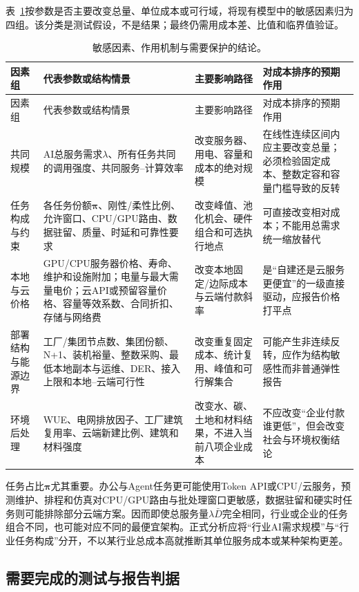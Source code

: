 \documentclass[preprint]{elsarticle}
\begin{document}
表~\ref{tab:sensitivity-driver-map}按参数是否主要改变总量、单位成本或可行域，将现有模型中的敏感因素归为四组。该分类是测试假设，不是结果；最终仍需用成本差、比值和临界值验证。

\begin{longtable}{p{2.6cm}p{4.7cm}p{3.6cm}p{3.0cm}}
 \caption{敏感因素、作用机制与需要保护的结论。}\label{tab:sensitivity-driver-map}\\
 \toprule
 因素组 & 代表参数或结构情景 & 主要影响路径 & 对成本排序的预期作用 \\
 \midrule
 \endfirsthead
 \toprule
 因素组 & 代表参数或结构情景 & 主要影响路径 & 对成本排序的预期作用 \\
 \midrule
 \endhead
 共同规模 & AI总服务需求$\lambda$、所有任务共同的调用强度、共同服务--计算效率 & 改变服务器、用电、容量和成本的绝对规模 & 在线性连续区间内应主要改变总量；必须检验固定成本、整数定容和容量门槛导致的反转 \\
 任务构成与约束 & 各任务份额$\bm\pi$、刚性/柔性比例、允许窗口、CPU/GPU路由、数据驻留、质量、时延和可靠性要求 & 改变峰值、池化机会、硬件组合和可选执行地点 & 可直接改变相对成本；不能用总需求统一缩放替代 \\
 本地与云价格 & GPU/CPU服务器价格、寿命、维护和设施附加；电量与最大需量电价；云API或预留容量价格、容量等效系数、合同折扣、存储与网络费 & 改变本地固定/边际成本与云端付款斜率 & 是“自建还是云服务更便宜”的一级直接驱动，应报告价格打平点 \\
 部署结构与能源边界 & 工厂/集团节点数、集团份额、N+1、装机裕量、整数采购、最低本地副本与运维、DER、接入上限和本地--云端可行性 & 改变重复固定成本、统计复用、峰值和可行解集合 & 可能产生非连续反转，应作为结构敏感性而非普通弹性报告 \\
 环境后处理 & WUE、电网排放因子、工厂建筑复用率、云端新建比例、建筑和材料强度 & 改变水、碳、土地和材料结果，不进入当前八项企业成本 & 不应改变“企业付款谁更低”，但会改变社会与环境权衡结论 \\
 \bottomrule
\end{longtable}

任务占比$\bm\pi$尤其重要。办公与Agent任务更可能使用Token API或CPU/云服务，预测维护、排程和仿真对CPU/GPU路由与批处理窗口更敏感，数据驻留和硬实时任务则可能排除部分云端方案。因而即使总服务量$\lambda\bar D$完全相同，行业或企业的任务组合不同，也可能对应不同的最便宜架构。正式分析应将“行业AI需求规模”与“行业任务构成”分开，不以某行业总成本高就推断其单位服务成本或某种架构更差。

\subsection{需要完成的测试与报告判据}
\end{document}
